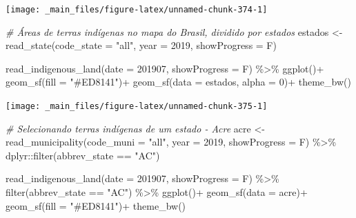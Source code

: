 \documentclass[
  brazilian,
]{book}
\newenvironment{Shaded}{\begin{snugshade}}{\end{snugshade}}
\newcommand{\AttributeTok}[1]{\textcolor[rgb]{0.77,0.63,0.00}{#1}}
\newcommand{\CommentTok}[1]{\textcolor[rgb]{0.56,0.35,0.01}{\textit{#1}}}
\newcommand{\DecValTok}[1]{\textcolor[rgb]{0.00,0.00,0.81}{#1}}
\newcommand{\FunctionTok}[1]{\textcolor[rgb]{0.00,0.00,0.00}{#1}}
\newcommand{\NormalTok}[1]{#1}
\newcommand{\OtherTok}[1]{\textcolor[rgb]{0.56,0.35,0.01}{#1}}
\newcommand{\SpecialCharTok}[1]{\textcolor[rgb]{0.00,0.00,0.00}{#1}}
\newcommand{\StringTok}[1]{\textcolor[rgb]{0.31,0.60,0.02}{#1}}
\begin{document}
\begin{center}\texttt{[image: \_main\_files/figure-latex/unnamed-chunk-374-1]} \end{center}

\begin{Shaded}
\begin{Highlighting}[]
\CommentTok{\# Áreas de terras indígenas no mapa do Brasil, dividido por estados}
\NormalTok{estados }\OtherTok{\textless{}{-}} \FunctionTok{read\_state}\NormalTok{(}\AttributeTok{code\_state =} \StringTok{"all"}\NormalTok{,}
                      \AttributeTok{year =} \DecValTok{2019}\NormalTok{,}
                      \AttributeTok{showProgress =}\NormalTok{ F)}


\FunctionTok{read\_indigenous\_land}\NormalTok{(}\AttributeTok{date =} \DecValTok{201907}\NormalTok{,}
                     \AttributeTok{showProgress =}\NormalTok{ F) }\SpecialCharTok{\%\textgreater{}\%} 
  \FunctionTok{ggplot}\NormalTok{()}\SpecialCharTok{+}
  \FunctionTok{geom\_sf}\NormalTok{(}\AttributeTok{fill =} \StringTok{"\#ED8141"}\NormalTok{)}\SpecialCharTok{+}
  \FunctionTok{geom\_sf}\NormalTok{(}\AttributeTok{data =}\NormalTok{ estados, }\AttributeTok{alpha =} \DecValTok{0}\NormalTok{)}\SpecialCharTok{+}
  \FunctionTok{theme\_bw}\NormalTok{()}
\end{Highlighting}
\end{Shaded}

\begin{center}\texttt{[image: \_main\_files/figure-latex/unnamed-chunk-375-1]} \end{center}

\begin{Shaded}
\begin{Highlighting}[]
\CommentTok{\# Selecionando terras indígenas de um estado {-} Acre}
\NormalTok{acre }\OtherTok{\textless{}{-}} \FunctionTok{read\_municipality}\NormalTok{(}\AttributeTok{code\_muni =} \StringTok{"all"}\NormalTok{,}
                          \AttributeTok{year =} \DecValTok{2019}\NormalTok{,}
                          \AttributeTok{showProgress =}\NormalTok{ F) }\SpecialCharTok{\%\textgreater{}\%} 
\NormalTok{  dplyr}\SpecialCharTok{::}\FunctionTok{filter}\NormalTok{(abbrev\_state }\SpecialCharTok{==} \StringTok{"AC"}\NormalTok{)}

\FunctionTok{read\_indigenous\_land}\NormalTok{(}\AttributeTok{date =} \DecValTok{201907}\NormalTok{,}
                     \AttributeTok{showProgress =}\NormalTok{ F) }\SpecialCharTok{\%\textgreater{}\%} 
  \FunctionTok{filter}\NormalTok{(abbrev\_state }\SpecialCharTok{==} \StringTok{"AC"}\NormalTok{) }\SpecialCharTok{\%\textgreater{}\%} 
  \FunctionTok{ggplot}\NormalTok{()}\SpecialCharTok{+}
  \FunctionTok{geom\_sf}\NormalTok{(}\AttributeTok{data =}\NormalTok{ acre)}\SpecialCharTok{+}
  \FunctionTok{geom\_sf}\NormalTok{(}\AttributeTok{fill =} \StringTok{"\#ED8141"}\NormalTok{)}\SpecialCharTok{+}
  \FunctionTok{theme\_bw}\NormalTok{()}
\end{Highlighting}
\end{Shaded}
\end{document}
